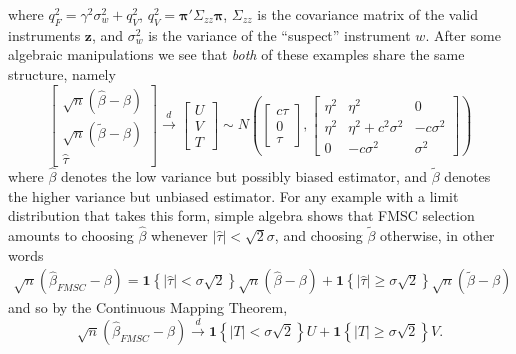 \documentclass[12pt,letterpaper]{article}
\begin{document}
where $q^2_{F} = \gamma^2 \sigma_w^2 + q^2_{V}$, $q^2_{V} = \boldsymbol{\pi}'\Sigma_{zz}\boldsymbol{\pi}$, $\Sigma_{zz}$ is the covariance matrix of the valid instruments $\mathbf{z}$, and $\sigma_w^2$ is the variance of the ``suspect'' instrument $w$.
After some algebraic manipulations we see that \emph{both} of these examples share the same structure, namely
\begin{equation}
  \left[ 
  \begin{array}{c}
    \sqrt{n} \left( \widehat{\beta} - \beta \right)\\
    \sqrt{n} \left( \widetilde{\beta} - \beta \right)\\
    \widehat{\tau}
\end{array}
\right] \overset{d}{\rightarrow} 
\left[
\begin{array}{c}
  U \\ V \\ T
\end{array}
\right] \sim
N\left( \left[
\begin{array}{c}
  c\tau\\ 0 \\ \tau
\end{array}
\right], 
\left[
\begin{array}{ccc}
  \eta^2 & \eta^2 & 0\\
  \eta^2 & \eta^2 + c^2 \sigma^2 & -c\sigma^2\\ 
  0 & -c\sigma^2 & \sigma^2 
\end{array}
\right]\right)
\label{eq:LimitExperiment}
\end{equation}
where $\widehat{\beta}$ denotes the low variance but possibly biased estimator, and $\widetilde{\beta}$ denotes the higher variance but unbiased estimator.
For any example with a limit distribution that takes this form, simple algebra shows that FMSC selection amounts to choosing $\widehat{\beta}$ whenever $|\widehat{\tau}|<\sqrt{2}\sigma$, and choosing $\widetilde{\beta}$ otherwise, in other words
\begin{eqnarray*}
  \sqrt{n}(\widehat{\beta}_{FMSC} - \beta) = \mathbf{1}\left\{ |\widehat{\tau}|<\sigma \sqrt{2} \right\} \sqrt{n}(\widehat{\beta} - \beta) +  \mathbf{1}\left\{ |\widehat{\tau}|\geq\sigma \sqrt{2} \right\}\sqrt{n}(\widetilde{\beta} - \beta)
\end{eqnarray*}
and so by the Continuous Mapping Theorem,
\begin{equation}
  \sqrt{n}(\widehat{\beta}_{FMSC} - \beta) \overset{d}{\rightarrow}  \mathbf{1}\left\{ |T|<\sigma \sqrt{2} \right\} U +  \mathbf{1}\left\{ |T|\geq\sigma \sqrt{2} \right\} V.
  \label{eq:FMSCLimitExperiment}
\end{equation}
\end{document}
